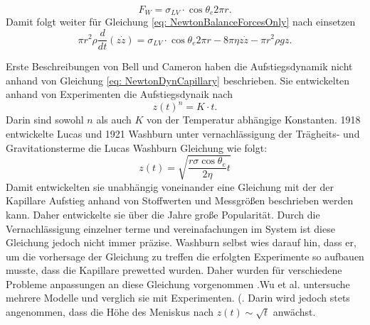 \begin{equation}
    F_W = \sigma_{LV} \cdot \cos \theta_e 2\pi r.
\end{equation}
Damit folgt weiter für Gleichung \ref{eq: NewtonBalanceForcesOnly} nach einsetzen \cite{fricke2023AnalyticalStudyCapillary}
\begin{equation}
\label{eq: NewtonDynCapillary}
    \pi r^2 \rho \frac{d}{dt} (z \dot{z}) = \sigma_{LV} \cdot \cos \theta_e 2\pi r-8\pi\eta z \dot{z}-\pi r^2 \rho g z.
\end{equation}

Erste Beschreibungen von Bell und Cameron \cite{bell1906FlowLiquidsCapillary} haben die Aufstiegsdynamik nicht anhand von Gleichung \ref{eq: NewtonDynCapillary} beschrieben. Sie entwickelten anhand von Experimenten die Aufstiegsdynaik nach 
\begin{equation}
    z(t)^n = K\cdot t.
\end{equation}
Darin sind sowohl $n$ als auch $K$ von der Temperatur abhängige Konstanten. 1918 entwickelte Lucas \cite{lucas1918UeberZeitgesetzKapillaren} und 1921 Washburn \cite{washburn1921DynamicsCapillaryFlow} unter vernachlässigung der Trägheits- und Gravitationsterme die Lucas Washburn Gleichung wie folgt:
\begin{equation}
\label{eq: LW-Eq}
    z(t) = \sqrt{\frac{r\sigma\cos\theta_e}{2\eta}t}
\end{equation}
Damit entwickelten sie unabhängig voneinander eine Gleichung mit der der Kapillare Aufstieg anhand von Stoffwerten und Messgrößen beschrieben werden kann. Daher entwickelte sie über die Jahre große Popularität. Durch die Vernachlässigung einzelner terme und vereinafachungen im System ist diese Gleichung jedoch nicht immer präzise. Washburn selbst wies darauf hin, dass er, um die vorhersage der Gleichung zu treffen die erfolgten Experimente so aufbauen musste, dass die Kapillare prewetted wurden. 
Daher wurden für verschiedene Probleme anpassungen an diese Gleichung vorgenommen \cite{dimitrov2007CapillaryRiseNanopores, heiranian2022ModifiedLucasWashburnTheory,cai2021LucasWashburnEquationBased,fries2008AnalyticSolutionCapillary,fricke2023AnalyticalStudyCapillary,delannoy2019DualRoleViscosity,martic2002MolecularDynamicsSimulation}.Wu et al. \cite{wu2017CapillaryRiseValidity} untersuche mehrere Modelle und verglich sie mit Experimenten. 
(. Darin wird jedoch stets angenommen, dass die Höhe des Meniskus nach $z(t)\sim \sqrt{t}$ anwächst.
